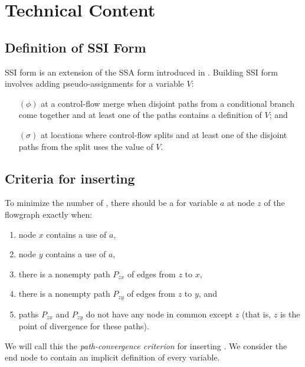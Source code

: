 \section{Technical Content} %

\subsection{Definition of SSI Form}
SSI form is an extension of the SSA form introduced in \cite{cytron89:ssa}.
Building SSI form involves adding pseudo-assignments for a variable $V$:
\begin{enumerate}
\item[$(\phi)$] at a control-flow merge when disjoint paths from a
conditional branch come together and at least one of the paths
contains a definition of $V$; and
\item[$(\sigma)$] at locations where control-flow splits and at least
one of the disjoint paths from the split uses the value of $V$.
\end{enumerate}

\subsection{Criteria for inserting }
To minimize the number of , there should be a
\sigfunction{} for variable $a$ at node $z$ of the flowgraph exactly
when:
\begin{enumerate}
\item node $x$ contains a use of $a$,
\item node $y$ contains a use of $a$,
\item there is a nonempty path $P_{zx}$ of edges from $z$ to $x$,
\item there is a nonempty path $P_{zy}$ of edges from $z$ to $y$, and
\item paths $P_{zx}$ and $P_{zy}$ do not have any node in common
except $z$ (that is, $z$ is the point of divergence for these paths).
\end{enumerate}
We will call this the \textit{path-convergence criterion} for
inserting .  We consider the end node to contain an
implicit definition of every variable.

